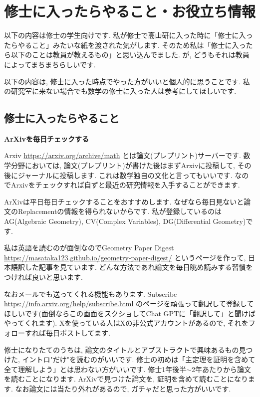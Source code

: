 \section{修士に入ったらやること・お役立ち情報}
\label{sec-3}
以下の内容は修士の学生向けです. 
私が修士で高山研に入った時に「修士に入ったらやること」みたいな紙を渡された気がします. 
そのため私は「修士に入ったら以下のことは教員が教えるもの」と思い込んでました.  
が, どうもそれは教員によってまちまちらしいです. 

以下の内容は, 修士に入った時点でやった方がいいと個人的に思うことです. 
 私の研究室に来ない場合でも数学の修士に入った人は参考にしてほしいです. 

\subsection{修士に入ったらやること}

\textbf{ArXivを毎日チェックする}  　\vspace{-6pt} 

Arxiv \url{https://arxiv.org/archive/math} とは論文(プレプリント)サーバーです. 
数学分野においては, 論文(プレプリント)が書けた後はまずArxivに投稿して, その後にジャーナルに投稿します. これは数学独自の文化と言ってもいいです.
なのでArxivをチェックすれば自ずと最近の研究情報を入手することができます. 

ArXivは平日毎日チェックすることをおすすめします. なぜなら毎日見ないと論文のReplacementの情報を得られないからです. 私が登録しているのはAG(Algebraic Geometry), CV(Complex Variables), DG(Differential Geometry)です. 

私は英語を読むのが面倒なのでGeometry Paper Digest \url{https://masataka123.github.io/geometry-paper-digest/} というページを作って, 日本語訳した記事を見ています. どんな方法であれ論文を毎日眺め読みする習慣をつければ良いと思います. 

なおメールでも送ってくれる機能もあります. 
Subscribe \url{https://info.arxiv.org/help/subscribe.html} のページを頑張って翻訳して登録してほしいです(面倒ならこの画面をスクショしてChat GPTに「翻訳して」と聞けばやってくれます). 
Xを使っている人はXの非公式アカウントがあるので, それをフォローすれば毎日ポストしてます. 

修士になりたてのうちは, 論文のタイトルとアブストラクトで興味あるもの見つけた, イントロ"だけ"を読むのがいいです. 修士の初めは「主定理を証明を含めて全て理解しよう」とは思わない方がいいです. 
修士1年後半$\sim$2年あたりから論文を読むことになります. 
ArXivで見つけた論文を, 証明を含めて読むことになります. なお論文には当たり外れがあるので, ガチャだと思った方がいいです. 

